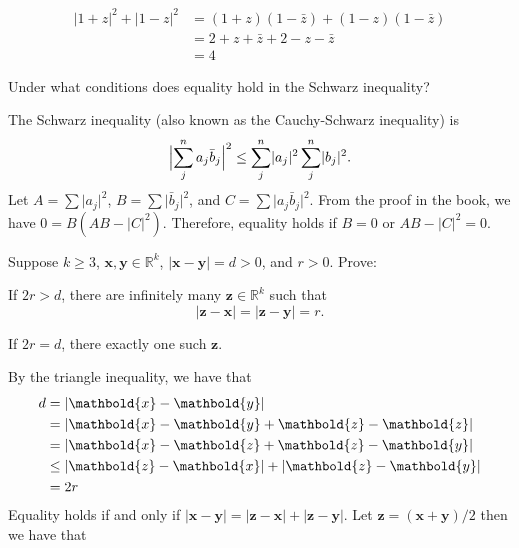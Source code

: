 \begin{exercise}
  \begin{align*}
    \lvert 1 + z\rvert^2 + \lvert 1 - z\rvert^2
    & = (1 + z)(1 - \bar{z}) + (1 - z)(1 - \bar{z})\\
    & = 2 + z + \bar{z} + 2 - z - \bar{z}\\
    & = 4
  \end{align*}
\item
  Under what conditions does equality hold in the Schwarz inequality?
  \par\smallskip
  The Schwarz inequality (also known as the Cauchy-Schwarz inequality) is
  \[
  \Bigl\lvert\sum_j^n a_j\bar{b}_j\Bigr\rvert^2\leq\sum_j^n\lvert a_j\rvert^2
  \sum_j^n\lvert b_j\rvert^2.
  \]
  Let \(A = \sum\lvert a_j\rvert^2\), \(B = \sum\lvert \bar{b}_j\rvert^2\), and
  \(C = \sum\lvert a_j\bar{b}_j\rvert^2\).
  From the proof in the book, we have \(0 = B(AB - \lvert C\rvert^2)\).
  Therefore, equality holds if \(B = 0\) or \(AB - \lvert C\rvert^2 = 0\).
\item
  Suppose \(k\geq 3\), \(\mathbold{x},\mathbold{y}\in\mathbb{R}^k\),
  \(\lvert\mathbold{x} - \mathbold{y}\rvert = d > 0\), and \(r > 0\).
  Prove:
  \begin{exercise}[label = (\alph*)]
  \item
    If \(2r > d\), there are infinitely many \(\mathbold{z}\in\mathbb{R}^k\)
    such that
    \[
    \lvert\mathbold{z} - \mathbold{x}\rvert =
    \lvert\mathbold{z} - \mathbold{y}\rvert = r.
    \]
  \item
    If \(2r = d\), there exactly one such \(\mathbold{z}\).
    \par\smallskip
    By the triangle inequality, we have that
    \[
      \begin{aligned}
    	     d &= \lvert\mathbold{x} - \mathbold{y}\rvert\notag \\
	        &= \lvert\mathbold{x} - \mathbold{y} + \mathbold{z} - \mathbold{z}\rvert\notag \\
	        &= \lvert\mathbold{x} - \mathbold{z} + \mathbold{z} - \mathbold{y}\rvert\notag \\
	        & \leq\lvert\mathbold{z} - \mathbold{x}\rvert + \lvert\mathbold{z} - \mathbold{y}\rvert\notag \\
	        &= 2r\notag
      \end{aligned}
    \]
    Equality holds if and only if \(\lvert\mathbold{x} - \mathbold{y}\rvert = 
    \lvert\mathbold{z} - \mathbold{x}\rvert + \lvert\mathbold{z} - \mathbold{y}\rvert\).
    Let \(\mathbold{z} = (\mathbold{x} + \mathbold{y}) / 2\) then we have that

\end{exercise}
\end{exercise}
